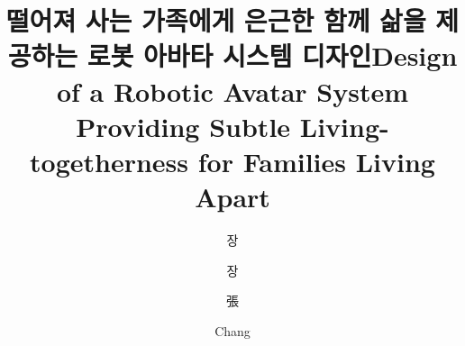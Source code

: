 \documentclass[master,korean,final,pdfdoc]{kaist-ucs}
\title[korean] {떨어져 사는 가족에게 은근한 함께 삶을 제공하는 로봇 아바타 시스템 디자인}
\title[english]{Design of a Robotic Avatar System Providing Subtle Living-togetherness for Families Living Apart}
\author[korean] {장}{영 재}
\author[korean2] {장}{영재}    %
\author[chinese]{張}{榮宰}
\author[english]{Chang}{Youngjae}
\begin{document}

\thesisinfo


\addtocounter{pagemarker}{1}    %
\newpage                        %

\tableofcontents                %
\listoftables                   %
\listoffigures                  %
















\label{paperlastpagelabel}
\end{document}
